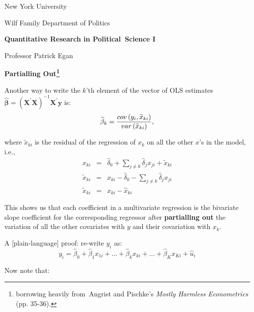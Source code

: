 \documentclass[11pt]{article}
\begin{document}
New York University

Wilf Family Department of Politics

\begin{center}
{\large \textbf{Quantitative Research in Political\ Science I}}

Professor Patrick Egan

\bigskip

\textbf{Partialling Out\footnote{%
borrowing heavily from\ Angrist and Pischke's \textit{Mostly Harmless
Econometrics} (pp. 35-36).}}
\end{center}

Another way to write the $k$'th element of the vector of OLS estimates $%
\widehat{\mathbf{\beta }}=\left( \mathbf{X}^{\prime }\mathbf{X}\right) ^{-1}%
\mathbf{X}^{\prime }\mathbf{y}$ is:%
\begin{equation*}
\widehat{\beta }_{k}=\frac{cov\left( y_{i},\widetilde{x}_{ki}\right) }{%
var\left( \widetilde{x}_{ki}\right) },
\end{equation*}

where $\widetilde{x}_{ki}$ is the residual of the regression of $x_{k}$ on
all the other $x$'s in the model, i.e.,%
\begin{eqnarray*}
x_{ki} &=&\widehat{\delta }_{0}+\sum\limits_{j\neq k}\widehat{\delta }%
_{j}x_{ji}+\widetilde{x}_{ki} \\
\widetilde{x}_{ki} &=&x_{ki}-\widehat{\delta }_{0}-\sum\limits_{j\neq k}%
\widehat{\delta }_{j}x_{ji} \\
\widetilde{x}_{ki} &=&x_{ki}-\widehat{x}_{ki}
\end{eqnarray*}

This shows us that each coefficient in a multivariate regression is the
bivariate slope coefficient for the corresponding regressor after \textbf{%
partialling out }the variation of all the other covariates with $y$ and
their covariation with $x_{k}$.\bigskip\ \ 

A [plain-language] proof: re-write $y_{i}$ as:%
\begin{equation*}
y_{i}=\widehat{\beta }_{0}+\widehat{\beta }_{1}x_{1i}+...+\widehat{\beta }%
_{k}x_{ki}+...+\widehat{\beta }_{K}x_{Ki}+\widehat{u}_{i}
\end{equation*}

Now note that:
\end{document}

